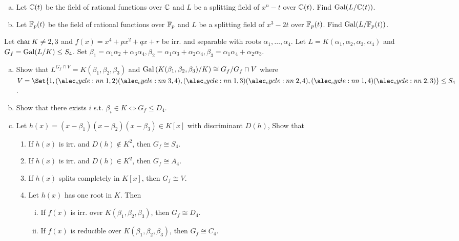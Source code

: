 \begin{exercise} \mbox{}
  \begin{enumerate}[(a)]
    \item Let $\mathbb{C}(t)$ be the field of rational functions over $\mathbb{C}$ and
      $L$ be a splitting field of $x^n - t$ over $\mathbb{C}(t)$.
      Find $\operatorname{Gal}(L / \mathbb{C}(t))$.
    \item Let $\mathbb{F}_p(t)$ be the field of rational functions over $\mathbb{F}_p$ and
      $L$ be a splitting field of $x^3 - 2t$ over $\mathbb{F}_p(t)$.
      Find $\operatorname{Gal}(L / \mathbb{F}_p(t))$.
  \end{enumerate}
\end{exercise}

\begin{exercise}
  Let $\operatorname{char} K \ne 2, 3$ and $f(x) = x^4 + px^2 + qx + r$ be irr. and separable
  with roots $\alpha_1, \dots, \alpha_4$. Let $L = K(\alpha_1, \alpha_2, \alpha_3, \alpha_4)$
  and $G_f = \operatorname{Gal}(L/K) \le S_4$. Set
  $\beta_1 = \alpha_1 \alpha_2 + \alpha_3 \alpha_4,
  \beta_2 = \alpha_1 \alpha_3 + \alpha_2 \alpha_4,
  \beta_3 = \alpha_1 \alpha_4 + \alpha_2 \alpha_3$.
  \begin{enumerate}[(a)]
    \item Show that $L^{G_f \cap V} = K(\beta_1, \beta_2, \beta_3)$ and
      $\operatorname{Gal}\left({K(\beta_1, \beta_2, \beta_3)}/{K}\right) \cong {G_f}/{G_f \cap V}$
      where $V = \Set{1, \cycle{1,2}\cycle{3,4}, \cycle{1,3}\cycle{2,4},
      \cycle{1,4}\cycle{2,3}} \le S_4$.
    \item Show that there exists $i$ s.t. $\beta_i \in K \iff G_f \le D_4$.
    \item Let $h(x) = (x-\beta_1)(x-\beta_2)(x-\beta_3) \in K[x]$ with discriminant
      $D(h)$, Show that
      \begin{enumerate}[(1)]
        \item If $h(x)$ is irr. and $D(h) \notin K^2$, then $G_f \cong S_4$.
        \item If $h(x)$ is irr. and $D(h) \in K^2$, then $G_f \cong A_4$.
        \item If $h(x)$ splits completely in $K[x]$, then $G_f \cong V$.
        \item Let $h(x)$ has one root in $K$. Then
          \begin{enumerate}[(i)]
            \item If $f(x)$ is irr. over $K(\beta_1, \beta_2, \beta_3)$, then
              $G_f \cong D_4$.
            \item If $f(x)$ is reducible over $K(\beta_1, \beta_2, \beta_3)$, then
              $G_f \cong C_4$.
          \end{enumerate}
      \end{enumerate}
  \end{enumerate}
\end{exercise}
